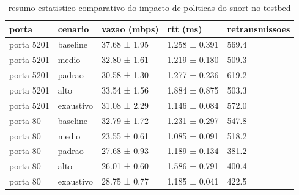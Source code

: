 \begin{table}
\caption{resumo estatistico comparativo do impacto de politicas do snort no testbed}
\label{tab:resultado_snort}
\begin{tabular}{lllll}
\toprule
porta & cenario & vazao (mbps) & rtt (ms) & retransmissoes \\
\midrule
porta 5201 & baseline & 37.68 ± 1.95 & 1.258 ± 0.391 & 569.4 \\
porta 5201 & medio & 32.80 ± 1.61 & 1.219 ± 0.180 & 509.3 \\
porta 5201 & padrao & 30.58 ± 1.30 & 1.277 ± 0.236 & 619.2 \\
porta 5201 & alto & 33.54 ± 1.56 & 1.884 ± 0.875 & 503.3 \\
porta 5201 & exaustivo & 31.08 ± 2.29 & 1.146 ± 0.084 & 572.0 \\
porta 80 & baseline & 32.79 ± 1.72 & 1.231 ± 0.297 & 547.8 \\
porta 80 & medio & 23.55 ± 0.61 & 1.085 ± 0.091 & 518.2 \\
porta 80 & padrao & 27.68 ± 0.93 & 1.189 ± 0.134 & 381.2 \\
porta 80 & alto & 26.01 ± 0.60 & 1.586 ± 0.791 & 400.4 \\
porta 80 & exaustivo & 28.75 ± 0.77 & 1.185 ± 0.041 & 422.5 \\
\bottomrule
\end{tabular}
\end{table}